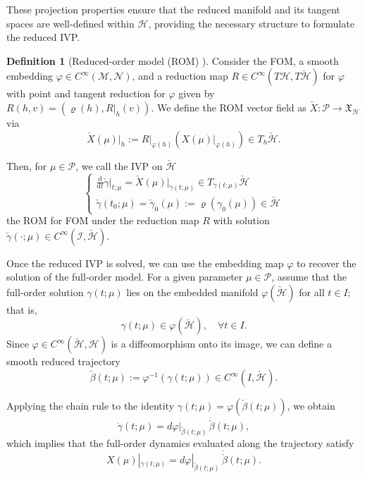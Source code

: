 \documentclass{article}
\theoremstyle{plain}
\theoremstyle{definition}
\newtheorem{definition}[theorem]{Definition}
\theoremstyle{remark}
\begin{document}
These projection properties ensure that the reduced manifold and its tangent spaces are well-defined within \(\mathcal{H}\), providing the necessary structure to formulate the reduced IVP.

\begin{definition}[Reduced-order model (ROM) \cite{buchfink2024}]
Consider the FOM, a smooth embedding $\varphi \in C^{\infty}(\mathcal{M}, \mathcal{N})$, and a reduction map $R \in C^{\infty}(T\mathcal{H}, T\check{\mathcal{H}})$ for $\varphi$ with point and tangent reduction for $\varphi$ given by $R(h,v) = (\varrho(h), R|_h(v))$. We define the ROM vector field as $\check{X}: \mathcal{P} \to \mathfrak{X}_{\mathcal{H}}$ via
\begin{equation}
\check{X}(\mu)\big|_h := R\big|_{\varphi(h)} \left( X(\mu)\big|_{\varphi(h)} \right) \in T_h\check{\mathcal{H}}.
\end{equation}

Then, for $\mu \in \mathcal{P}$, we call the IVP on $\check{\mathcal{H}}$
\begin{equation}
\begin{cases}
\frac{\mathrm{d}}{\mathrm{d}t}\check{\gamma}\big|_{t;\mu} = \check{X}(\mu)\big|_{\check{\gamma}(t;\mu)} \in T_{\check{\gamma}(t;\mu)}\check{\mathcal{H}} \\[0.5em]
\check{\gamma}(t_0; \mu) = \check{\gamma}_0(\mu) := \varrho(\gamma_0(\mu)) \in \check{\mathcal{H}}
\end{cases}
\end{equation}
the ROM for FOM under the reduction map $R$ with solution $\check{\gamma}(\cdot; \mu) \in C^{\infty}(\mathcal{I}, \check{\mathcal{H}})$.
\end{definition}

Once the reduced IVP is solved, we can use the embedding map \(\varphi\) to recover the solution of the full-order model. For a given parameter \(\mu \in \mathcal{P}\), assume that the full-order solution \(\gamma(t; \mu)\) lies on the embedded manifold \(\varphi(\check{\mathcal{H}})\) for all \(t \in I\); that is,
\[
\gamma(t; \mu) \in \varphi(\check{\mathcal{H}}), \quad \forall t \in I.
\]
Since \(\varphi \in C^\infty(\check{\mathcal{H}}, \mathcal{H})\) is a diffeomorphism onto its image, we can define a smooth reduced trajectory
\begin{equation}
\label{eq: beta}
    \check{\beta}(t; \mu) := \varphi^{-1}(\gamma(t; \mu)) \in C^\infty(I, \check{\mathcal{H}}).
\end{equation}


Applying the chain rule to the identity \(\gamma(t; \mu) = \varphi(\check{\beta}(t; \mu))\), we obtain
\[
\dot{\gamma}(t; \mu) = d\varphi|_{\check{\beta}(t; \mu)} \, \dot{\check{\beta}}(t; \mu),
\]
which implies that the full-order dynamics evaluated along the trajectory satisfy
\begin{equation}
    \label{eq: condition_2}
    X(\mu)|_{\gamma(t; \mu)} = d\varphi|_{\check{\beta}(t; \mu)} \, \dot{\check{\beta}}(t; \mu).
\end{equation}
\end{document}
